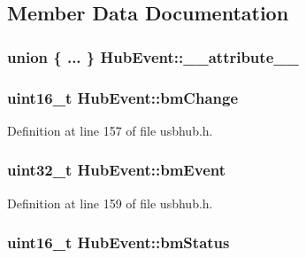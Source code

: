 \subsection{\-Member \-Data \-Documentation}
\hypertarget{struct_hub_event_a576c08d55d8b308c55fa941f28f20ea8}{
\subsubsection[{\-\_\-\-\_\-attribute\-\_\-\-\_\-}]{\setlength{\rightskip}{0pt plus 5cm}union \{ ... \}   {\bf \-Hub\-Event\-::\-\_\-\-\_\-attribute\-\_\-\-\_\-}}}\label{struct_hub_event_a576c08d55d8b308c55fa941f28f20ea8}
\hypertarget{struct_hub_event_a9a5761abdc6e8ffc814ba8d3b5b9cd7f}{
\subsubsection[{bm\-Change}]{\setlength{\rightskip}{0pt plus 5cm}uint16\-\_\-t {\bf \-Hub\-Event\-::bm\-Change}}}\label{struct_hub_event_a9a5761abdc6e8ffc814ba8d3b5b9cd7f}


\-Definition at line 157 of file usbhub.\-h.

\hypertarget{struct_hub_event_aa7eab68768439ce3a208b3fa4c671a3c}{
\subsubsection[{bm\-Event}]{\setlength{\rightskip}{0pt plus 5cm}uint32\-\_\-t {\bf \-Hub\-Event\-::bm\-Event}}}\label{struct_hub_event_aa7eab68768439ce3a208b3fa4c671a3c}


\-Definition at line 159 of file usbhub.\-h.

\hypertarget{struct_hub_event_a40dc52f2eb375e6f7ace509a985525ac}{
\subsubsection[{bm\-Status}]{\setlength{\rightskip}{0pt plus 5cm}uint16\-\_\-t {\bf \-Hub\-Event\-::bm\-Status}}}\label{struct_hub_event_a40dc52f2eb375e6f7ace509a985525ac}


